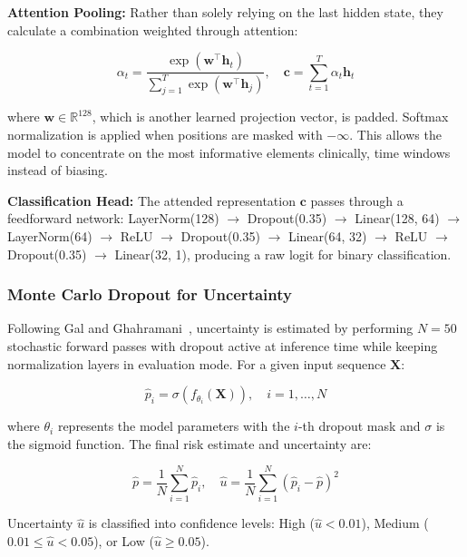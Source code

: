 \documentclass[runningheads]{llncs}
\begin{document}
\textbf{Attention Pooling:} Rather than solely relying on the last hidden state, they calculate a combination weighted through attention:

\begin{equation}
\alpha_t = \frac{\exp(\mathbf{w}^\top \mathbf{h}_t)}{\sum_{j=1}^{T} \exp(\mathbf{w}^\top \mathbf{h}_j)}, \quad \mathbf{c} = \sum_{t=1}^{T} \alpha_t \mathbf{h}_t
\end{equation}

where $\mathbf{w} \in \mathbb{R}^{128}$, which is another learned projection vector, is padded. Softmax normalization is applied when positions are masked with $-\infty$. This allows the model to concentrate on the most informative elements clinically, time windows instead of biasing.

\textbf{Classification Head:} The attended representation $\mathbf{c}$ passes through a feedforward network: LayerNorm(128) $\rightarrow$ Dropout(0.35) $\rightarrow$ Linear(128, 64) $\rightarrow$ LayerNorm(64) $\rightarrow$ ReLU $\rightarrow$ Dropout(0.35) $\rightarrow$ Linear(64, 32) $\rightarrow$ ReLU $\rightarrow$ Dropout(0.35) $\rightarrow$ Linear(32, 1), producing a raw logit for binary classification.

\subsubsection{Monte Carlo Dropout for Uncertainty}
Following Gal and Ghahramani~\cite{Gal2016}, uncertainty is estimated by performing $N = 50$ stochastic forward passes with dropout active at inference time while keeping normalization layers in evaluation mode. For a given input sequence $\mathbf{X}$:

\begin{equation}
\hat{p}_i = \sigma(f_{\theta_i}(\mathbf{X})), \quad i = 1, \ldots, N
\end{equation}

where $\theta_i$ represents the model parameters with the $i$-th dropout mask and $\sigma$ is the sigmoid function. The final risk estimate and uncertainty are:

\begin{equation}
\hat{p} = \frac{1}{N} \sum_{i=1}^{N} \hat{p}_i, \quad \hat{u} = \frac{1}{N} \sum_{i=1}^{N} (\hat{p}_i - \hat{p})^2
\end{equation}

Uncertainty $\hat{u}$ is classified into confidence levels: High ($\hat{u} < 0.01$), Medium ($0.01 \leq \hat{u} < 0.05$), or Low ($\hat{u} \geq 0.05$).
\end{document}
